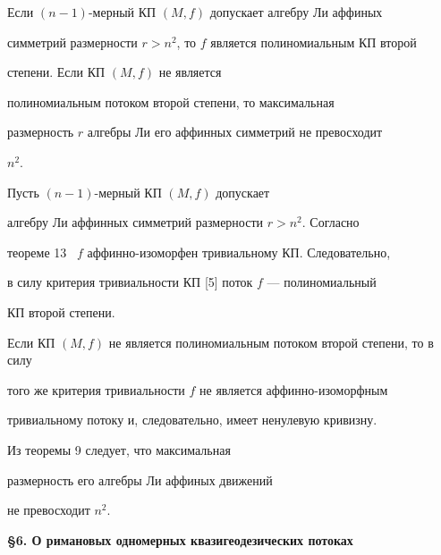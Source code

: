\begin{thm}


Если $(n-1)$-мерный КП $(M,f) $ допускает алгебру Ли аффиных


симметрий размерности $r>n^2$, то $f$ является полиномиальным КП второй


степени. Если КП $(M,f) $ не является


полиномиальным потоком второй степени, то максимальная 


размерность $r$ алгебры Ли его аффинных симметрий не превосходит


$n^2$.


\end{thm}





\begin{pf}


Пусть $(n-1)$-мерный КП $(M,f) $ допускает


алгебру Ли аффинных симметрий размерности $r>n^2$. Согласно


теореме 13 \ $f$ аффинно-изоморфен тривиальному КП. Следовательно,


в силу критерия тривиальности КП [5] поток $f$ --- полиномиальный


КП второй степени.





Если КП $(M,f) $ не является полиномиальным потоком второй степени, то в силу


того же критерия тривиальности $f$ не является аффинно-изоморфным


тривиальному потоку и, следовательно, имеет ненулевую кривизну.


Из теоремы 9 следует, что максимальная


размерность его алгебры Ли аффиных движений


не превосходит $n^2$.


\end{pf}


\medskip





\begin{center}


{\bf \S 6. О римановых одномерных квазигеодезических потоках}


\end{center}


\medskip








